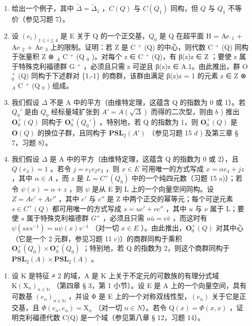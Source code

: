 \begin{enumerate}
\def\labelenumi{\alph{enumi})}
\item
  给出一个例子，其中 \(\tilde{\Delta} = \tilde{\Delta}_{1}\) ，\(C(Q)\) 与 \(C(Q_{1})\) 同构，但 \(Q\) 与 \(Q_{1}\) 不等价（参见习题 7）。
\item
  设 \((e_i)_{1\leqslant i\leqslant 4}\) 是 E 关于 Q 的一个正交基，\(Q_0\) 是 Q 在超平面 H = Ae \(_1\) + Ae \(_2\) + Ae \(_3\) 上的限制。证明：若 Z 是 C \(^+\) (Q) 的中心，则代数 C \(^+\) (Q) 同构于张量积 Z ⊗ \(_A\) C \(^+\) (Q \(_0\) )。对每个 z ∈ C \(^+\) (Q)，有 β(z)z ∈ Z ；要使 z 属于特殊克利福德群 G \(^+\) ，必须且只需 z 可逆且 β(z)z ∈ A.1。由此推出，群 O \(_0^+\) (Q) 同构于下述群对 \{1,-1\} 的商群，该群由满足 β(z)z = 1 的元素 z ∈ Z ⊗ \(_A\) C \(^+\) (Q \(_0\) ) 组成。
\item
  我们假设 \(\Delta\) 不是 A 中的平方（由维特定理，这蕴含 Q 的指数为 0 或 1）。若 \(Q_0'\) 是由 \(Q_0\) 经标量域扩张到 \(A' = A(\sqrt{\Delta})\) 而得的二次型，则由 \(b\) ) 推出 \(\mathbf{O}_0^+(Q)\) 同构于 \(\mathbf{O}_0^+(Q_0')\) 。特别地，若 Q 的指数为 1，则 \(\mathbf{O}_0^+(Q)\) 是 \(\mathbf{O}(Q)\) 的换位子群，且同构于 \(\mathbf{PSL}_2(A')\) （参见习题 15 \(d\) ) 及第三章 § 7，习题 8）。
\item
  我们假设 \(\Delta\) 是 A 中的平方（由维特定理，这蕴含 Q 的指数为 0 或 2），且 \(Q(e_4) = 1\) 。若令 \(j = e_1e_2e_3\) ，则 \(x \in E\) 可用唯一的方式写成 \(x = \alpha e_4 + jz\) ，其中 \(\alpha \in A\) ，而 \(z\) 是 \(L = C^+(Q_0)\) 中的一个纯四元数（习题 15 a)）；若令 \(\psi(x) = \alpha + z\) ，则 \(\psi\) 是从 E 到 L 上的一个向量空间同构。设 \(Z = Ac' + Ac''\) ，其中 \(c'\) 与 \(c''\) 是 Z 中两个正交的幂等元；每个可逆元素 \(s \in C^+(Q)\) 都可用唯一的方式写成 \(s = uc' + vc''\) ，其中 \(u\) 与 \(\nu\) 属于 L；要使 \(s\) 属于特殊克利福德群 \(G^+\) ，必须且只需 \(u\bar{u} = v\bar{v}\) ，而这时有 \(\psi(sxs^{-1}) = u\psi(x)v^{-1}\) （对一切 \(x \in E\) ）。由此推出，\(\mathbf{O}_0^+(Q)\) 对其中心（它是一个 2 元群，参见习题 11 c)）的商群同构于乘积 \(\mathbf{O}_0^+(Q_0) \times \mathbf{O}_0^+(Q_0)\) ；特别地，若 Q 的指数为 2，则这个商群同构于 \(\mathbf{PSL}_2(A) \times \mathbf{PSL}_2(A)\) 。
\end{enumerate}

\begin{enumerate}
\def\labelenumi{\arabic{enumi})}
\setcounter{enumi}{16}
\tightlist
\item
  设 K 是特征 ≠ 2 的域，A 是 K 上关于不定元的可数族的有理分式域 \(\mathrm{K}(\mathrm{X}_{n})_{n\in\mathbb{N}}\) （第四章 § 3，第 1 小节）。设 E 是 A 上的一个向量空间，具有可数基 \((e_{n})_{n\in\mathbb{N}}\) ，并设 Φ 是 E 上的一个对称双线性型，\((e_{n})\) 关于它是正交基，且 \(\Phi(e_{n}, e_{n}) = \mathrm{X}_{n}\) （对一切 \(n \in N\)）。若令 \(\mathrm{Q}(x) = \Phi(x, x)\) ，证明克利福德代数 C(Q) 是一个域（参见第八章 § 12，习题 14）。
\end{enumerate}

